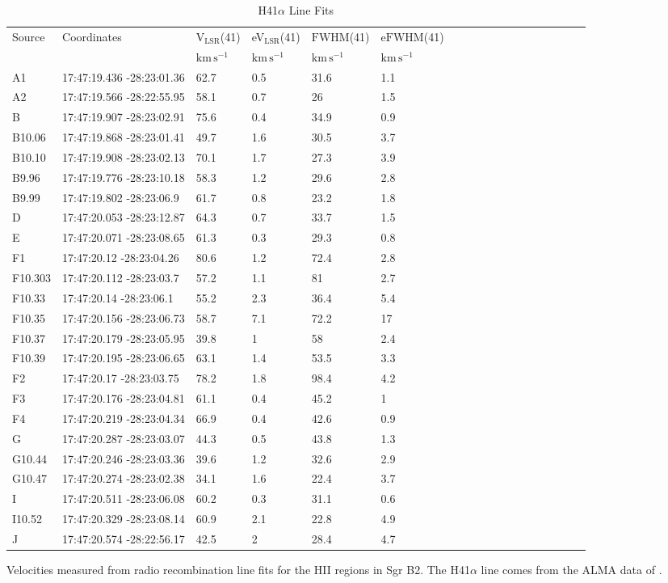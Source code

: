 \begin{table}[htp]
\caption{H41$\alpha$ Line Fits}

\begin{tabular}{llllllllllllllllll}
\label{tab:h41afits}
Source & Coordinates & V$_\mathrm{LSR}$(41) & eV$_\mathrm{LSR}$(41) & $\mathrm{FWHM}$(41) & e$\mathrm{FWHM}$(41) \\
 &  & $\mathrm{km\,s^{-1}}$ & $\mathrm{km\,s^{-1}}$ & $\mathrm{km\,s^{-1}}$ & $\mathrm{km\,s^{-1}}$ \\
\hline
A1 & 17:47:19.436 -28:23:01.36 & 62.7 & 0.5 & 31.6 & 1.1 \\
A2 & 17:47:19.566 -28:22:55.95 & 58.1 & 0.7 & 26 & 1.5 \\
B & 17:47:19.907 -28:23:02.91 & 75.6 & 0.4 & 34.9 & 0.9 \\
B10.06 & 17:47:19.868 -28:23:01.41 & 49.7 & 1.6 & 30.5 & 3.7 \\
B10.10 & 17:47:19.908 -28:23:02.13 & 70.1 & 1.7 & 27.3 & 3.9 \\
B9.96 & 17:47:19.776 -28:23:10.18 & 58.3 & 1.2 & 29.6 & 2.8 \\
B9.99 & 17:47:19.802 -28:23:06.9 & 61.7 & 0.8 & 23.2 & 1.8 \\
D & 17:47:20.053 -28:23:12.87 & 64.3 & 0.7 & 33.7 & 1.5 \\
E & 17:47:20.071 -28:23:08.65 & 61.3 & 0.3 & 29.3 & 0.8 \\
F1 & 17:47:20.12 -28:23:04.26 & 80.6 & 1.2 & 72.4 & 2.8 \\
F10.303 & 17:47:20.112 -28:23:03.7 & 57.2 & 1.1 & 81 & 2.7 \\
F10.33 & 17:47:20.14 -28:23:06.1 & 55.2 & 2.3 & 36.4 & 5.4 \\
F10.35 & 17:47:20.156 -28:23:06.73 & 58.7 & 7.1 & 72.2 & 17 \\
F10.37 & 17:47:20.179 -28:23:05.95 & 39.8 & 1 & 58 & 2.4 \\
F10.39 & 17:47:20.195 -28:23:06.65 & 63.1 & 1.4 & 53.5 & 3.3 \\
F2 & 17:47:20.17 -28:23:03.75 & 78.2 & 1.8 & 98.4 & 4.2 \\
F3 & 17:47:20.176 -28:23:04.81 & 61.1 & 0.4 & 45.2 & 1 \\
F4 & 17:47:20.219 -28:23:04.34 & 66.9 & 0.4 & 42.6 & 0.9 \\
G & 17:47:20.287 -28:23:03.07 & 44.3 & 0.5 & 43.8 & 1.3 \\
G10.44 & 17:47:20.246 -28:23:03.36 & 39.6 & 1.2 & 32.6 & 2.9 \\
G10.47 & 17:47:20.274 -28:23:02.38 & 34.1 & 1.6 & 22.4 & 3.7 \\
I & 17:47:20.511 -28:23:06.08 & 60.2 & 0.3 & 31.1 & 0.6 \\
I10.52 & 17:47:20.329 -28:23:08.14 & 60.9 & 2.1 & 22.8 & 4.9 \\
J & 17:47:20.574 -28:22:56.17 & 42.5 & 2 & 28.4 & 4.7 \\
\hline
\end{tabular}
\par
Velocities measured from radio recombination line fits for the HII regions in Sgr B2.  The H41$\alpha$ line comes from the ALMA data of \citet{Ginsburg2018a}.
\end{table}
